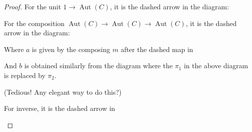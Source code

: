 \documentclass[a4paper]{article}
\DeclareMathOperator{\Aut}{\text {Aut}}
\DeclareMathOperator{\pr}{\sf pr}
\begin{document}
\begin{proof}
    For the unit $1\to \Aut(C)$, it is the dashed arrow in the diagram:

    \begin{center}
    \end{center}

    For the composition $\Aut(C)\to \Aut(C)\to \Aut(C)$, it is the dashed arrow in the diagram:

    \begin{center}
    \end{center}

    Where $a$ is given by the composing $m$ after the dashed map in 
    \begin{center}
    \end{center}

    And $b$ is obtained similarly from the diagram where the $\pi_1$ in the above diagram is replaced by $\pi_2$.

    (Tedious! Any elegant way to do this?)

    For inverse, it is the dashed arrow in 

    \begin{center}
    \end{center}









\end{proof}
\end{document}
